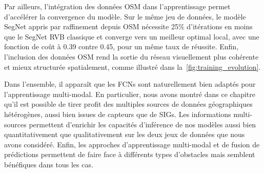 Par ailleurs, l'intégration des données \gls{OSM} dans l'apprentissage permet d'accélérer la convergence du modèle. Sur le même jeu de données, le modèle SegNet appris par raffinement depuis \gls{OSM} nécessite 25\% d'itérations en moins que le SegNet \gls{RVB} classique et converge vers un meilleur optimal local, avec une fonction de coût à \num{0,39} contre \num{0,45}, pour un même taux de réussite. Enfin, l'inclusion des données \gls{OSM} rend la sortie du réseau visuellement plus cohérente et mieux structurée spatialement, comme illustré dans la~\cref{fig:training_evolution}.

Dans l'ensemble, il apparaît que les \glspl{FCN} sont naturellement bien adaptés pour l'apprentissage multi-modal. En particulier, nous avons montré dans ce chapitre qu'il est possible de tirer profit des multiples sources de données géographiques hétérogènes, aussi bien issues de capteurs que de \glspl{SIG}. Les informations multi-sources permettent d'enrichir les capacités d'inférence de nos modèles aussi bien quantitativement que qualitativement sur les deux jeux de données que nous avons considéré. Enfin, les approches d'apprentissage multi-modal et de fusion de prédictions permettent de faire face à différents types d'obstacles mais semblent bénéfiques dans tous les cas.
%
%
\printbibliography
